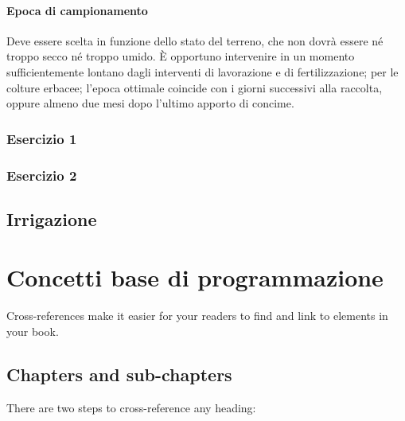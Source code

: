 \documentclass[
]{book}
\begin{document}
\hypertarget{epoca-di-campionamento}{%
\subsubsection{Epoca di campionamento}\label{epoca-di-campionamento}}

Deve essere scelta in funzione dello stato del terreno, che non dovrà
essere né troppo secco né troppo umido. È opportuno intervenire in un
momento sufficientemente lontano dagli interventi di lavorazione e di
fertilizzazione; per le colture erbacee; l'epoca ottimale coincide con i
giorni successivi alla raccolta, oppure almeno due mesi dopo l'ultimo
apporto di concime.

\hypertarget{esercizio-1}{%
\subsection{Esercizio 1}\label{esercizio-1}}

\hypertarget{esercizio-2}{%
\subsection{Esercizio 2}\label{esercizio-2}}

\hypertarget{irrigazione}{%
\section{Irrigazione}\label{irrigazione}}

\hypertarget{cross}{%
\chapter{Concetti base di programmazione}\label{cross}}

Cross-references make it easier for your readers to find and link to
elements in your book.

\hypertarget{chapters-and-sub-chapters}{%
\section{Chapters and sub-chapters}\label{chapters-and-sub-chapters}}

There are two steps to cross-reference any heading:
\end{document}
